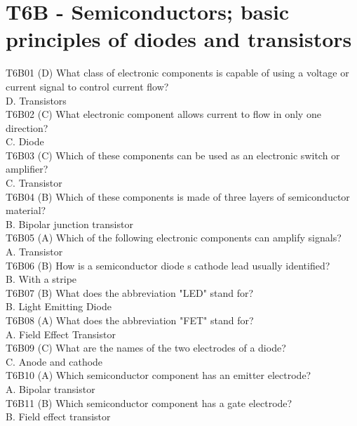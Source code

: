 \documentclass[12pt,letterpaper]{report}
\begin{document}
\section{T6B - Semiconductors; basic principles of diodes and transistors}

T6B01 (D) What class of electronic components is capable of using a voltage or current signal to control current flow?\\
D. Transistors\\

T6B02 (C) What electronic component allows current to flow in only one direction?\\
C. Diode\\

T6B03 (C) Which of these components can be used as an electronic switch or amplifier?\\
C. Transistor\\

T6B04 (B) Which of these components is made of three layers of semiconductor material?\\
B. Bipolar junction transistor\\

T6B05 (A) Which of the following electronic components can amplify signals?\\
A. Transistor\\

T6B06 (B) How is a semiconductor diode s cathode lead usually identified?\\
B. With a stripe\\

T6B07 (B) What does the abbreviation "LED" stand for?\\
B. Light Emitting Diode\\

T6B08 (A) What does the abbreviation "FET" stand for?\\
A. Field Effect Transistor\\

T6B09 (C) What are the names of the two electrodes of a diode?\\
C. Anode and cathode\\

T6B10 (A) Which semiconductor component has an emitter electrode?\\
A. Bipolar transistor\\

T6B11 (B) Which semiconductor component has a gate electrode?\\
B. Field effect transistor\\
\end{document}

